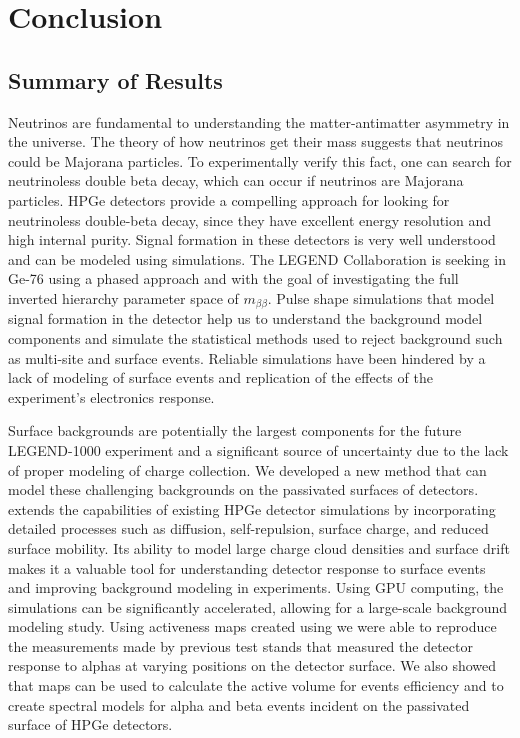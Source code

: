 \chapter{Conclusion}
\label{chap:conclusion}
\section{Summary of Results}
Neutrinos are fundamental to understanding the matter-antimatter asymmetry in the universe. The theory of how neutrinos get their mass suggests that neutrinos could be Majorana particles. To experimentally verify this fact, one can search for neutrinoless double beta decay, which can occur if neutrinos are Majorana particles. HPGe detectors provide a compelling approach for looking for neutrinoless double-beta decay, since they have excellent energy resolution and high internal purity. Signal formation in these detectors is very well understood and can be modeled using simulations. The LEGEND Collaboration is seeking {\onbb} in Ge-76 using a phased approach and with the goal of investigating the full inverted hierarchy parameter space of $m_{\beta \beta}$. Pulse shape simulations that model signal formation in the detector help us to understand the background model components and simulate the statistical methods used to reject background such as multi-site and surface events. Reliable simulations have been hindered by a lack of modeling of surface events and replication of the effects of the experiment's electronics response.

Surface backgrounds are potentially the largest components for the future LEGEND-1000 experiment and a significant source of uncertainty due to the lack of proper modeling of charge collection. We developed a new method that can model these challenging backgrounds on the passivated surfaces of detectors. {\ehd} extends the capabilities of existing HPGe detector simulations by incorporating detailed processes such as diffusion, self-repulsion, surface charge, and reduced surface mobility. Its ability to model large charge cloud densities and surface drift makes it a valuable tool for understanding detector response to surface events and improving background modeling in experiments. Using GPU computing, the simulations can be significantly accelerated, allowing for a large-scale background modeling study. Using activeness maps created using {\ehd} we were able to reproduce the measurements made by previous test stands that measured the detector response to alphas at varying positions on the detector surface. We also showed that maps can be used to calculate the active volume for {\onbb} events efficiency and to create spectral models for alpha and beta events incident on the passivated surface of HPGe detectors.

